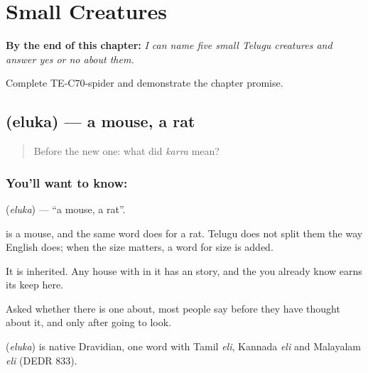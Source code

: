 
\chapter{Small Creatures}
\label{ch:te-small-creatures}

\begin{chapteropening}
\textbf{By the end of this chapter:} \emph{I can name five small Telugu creatures and answer yes or no about them.}

Complete TE-C70-spider and demonstrate the chapter promise.
\end{chapteropening}

\section[\texorpdfstring{\te{ఎలుక} (eluka)}{ఎలుక (eluka)}]{ (eluka) — a mouse, a rat}

\label{lesson:TE-C70-mouse}



\begin{quote}
Before the new one: what did \emph{karra} mean?
\end{quote}

\subsection*{You'll want to know: }
\textbf{} (\emph{eluka}) — \textquotedblleft{}a mouse, a rat\textquotedblright{}.

 is a mouse, and the same word does for a rat. Telugu does not split them the way English does; when the size matters, a word for size is added.

It is inherited. Any house with  in it has an  story, and the  you already know earns its keep here.

Asked whether there is one about, most people say  before they have thought about it, and  only after going to look.

\begin{cousinweb}
\textbf{} (\emph{eluka}) is native Dravidian, one word with Tamil \emph{eli}, Kannada \emph{eli} and Malayalam \emph{eli} (DEDR 833).
\end{cousinweb}


